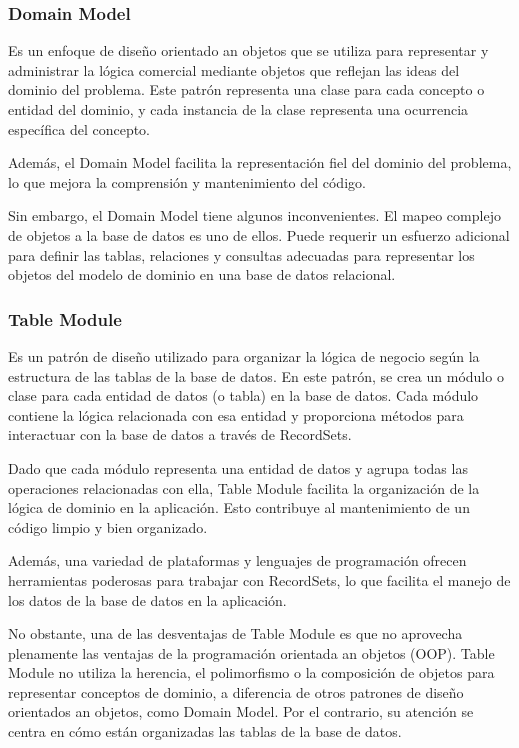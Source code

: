 \documentclass{article}
\begin{document}
		\subsubsection{Domain Model}
		Es un enfoque de diseño orientado an objetos que se utiliza para representar y administrar la lógica comercial mediante objetos que reflejan las ideas del dominio del problema. Este patrón representa una clase para cada concepto o entidad del dominio, y cada instancia de la clase representa una ocurrencia específica del concepto.
		
		Además, el Domain Model facilita la representación fiel del dominio del problema, lo que mejora la comprensión y mantenimiento del código. 
		
		Sin embargo, el Domain Model tiene algunos inconvenientes. El mapeo complejo de objetos a la base de datos es uno de ellos. Puede requerir un esfuerzo adicional para definir las tablas, relaciones y consultas adecuadas para representar los objetos del modelo de dominio en una base de datos relacional.
		\subsubsection{Table Module}
		
		Es un patrón de diseño utilizado para organizar la lógica de negocio según la estructura de las tablas de la base de datos. En este patrón, se crea un módulo o clase para cada entidad de datos (o tabla) en la base de datos. Cada módulo contiene la lógica relacionada con esa entidad y proporciona métodos para interactuar con la base de datos a través de RecordSets.
		
		Dado que cada módulo representa una entidad de datos y agrupa todas las operaciones relacionadas con ella, Table Module facilita la organización de la lógica de dominio en la aplicación. Esto contribuye al mantenimiento de un código limpio y bien organizado.
		
		Además, una variedad de plataformas y lenguajes de programación ofrecen herramientas poderosas para trabajar con RecordSets, lo que facilita el manejo de los datos de la base de datos en la aplicación.
		
		No obstante, una de las desventajas de Table Module es que no aprovecha plenamente las ventajas de la programación orientada an objetos (OOP). Table Module no utiliza la herencia, el polimorfismo o la composición de objetos para representar conceptos de dominio, a diferencia de otros patrones de diseño orientados an objetos, como Domain Model. Por el contrario, su atención se centra en cómo están organizadas las tablas de la base de datos.
		
\end{document}
